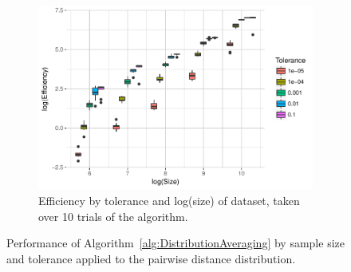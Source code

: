 \documentclass{article}
\begin{document}
\begin{figure}
\begin{subfigure}{0.5\textwidth}
        \includegraphics[width=\linewidth]{Figures/PairwiseDistance/efficiency_by_size_and_tol.pdf}
        \caption{Efficiency by tolerance and log(size) of dataset, taken over 10 trials of the algorithm.}
        \label{fig:PDEfficiencyBySize}
    \end{subfigure}
    \caption{Performance of Algorithm~\ref{alg:DistributionAveraging} by sample size and tolerance applied to the pairwise distance distribution.}
\end{figure}
\end{document}
